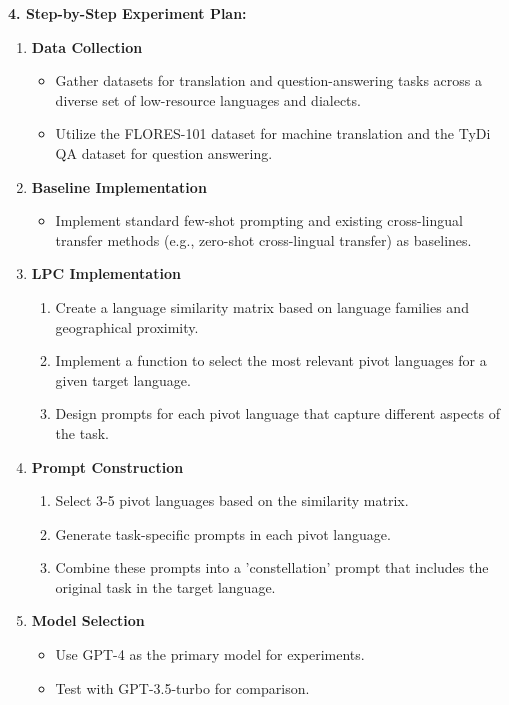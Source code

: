 \begin{tcolorbox}[colback=blue!5!white,colframe=blue!75!black,title=\textbf{Linguistic Pivot Constellation (LPC): Enhancing Cross-Lingual Transfer for Low-Resource Languages and Dialects (Part 1)}]
    \textbf{4. Step-by-Step Experiment Plan:}
    \begin{enumerate}
        \item \textbf{Data Collection}
        \begin{itemize}
            \item Gather datasets for translation and question-answering tasks across a diverse set of low-resource languages and dialects.
            \item Utilize the FLORES-101 dataset for machine translation and the TyDi QA dataset for question answering.
        \end{itemize}
        \item \textbf{Baseline Implementation}
        \begin{itemize}
            \item Implement standard few-shot prompting and existing cross-lingual transfer methods (e.g., zero-shot cross-lingual transfer) as baselines.
        \end{itemize}
        \item \textbf{LPC Implementation}
        \begin{enumerate}
            \item Create a language similarity matrix based on language families and geographical proximity.
            \item Implement a function to select the most relevant pivot languages for a given target language.
            \item Design prompts for each pivot language that capture different aspects of the task.
        \end{enumerate}
        \item \textbf{Prompt Construction}
        \begin{enumerate}
            \item Select 3-5 pivot languages based on the similarity matrix.
            \item Generate task-specific prompts in each pivot language.
            \item Combine these prompts into a 'constellation' prompt that includes the original task in the target language.
        \end{enumerate}
        \item \textbf{Model Selection}
        \begin{itemize}
            \item Use GPT-4 as the primary model for experiments.
            \item Test with GPT-3.5-turbo for comparison.

\end{itemize}
\end{enumerate}
\end{tcolorbox}

